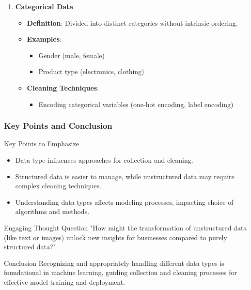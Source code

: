 \documentclass[aspectratio=169]{beamer}
\begin{document}
\begin{frame}[fragile]
\begin{enumerate}
        \item \textbf{Categorical Data}
            \begin{itemize}
                \item \textbf{Definition}: Divided into distinct categories without intrinsic ordering.
                \item \textbf{Examples}:
                    \begin{itemize}
                        \item Gender (male, female)
                        \item Product type (electronics, clothing)
                    \end{itemize}
                \item \textbf{Cleaning Techniques}:
                    \begin{itemize}
                        \item Encoding categorical variables (one-hot encoding, label encoding)
                    \end{itemize}
            \end{itemize}
    \end{enumerate}
\end{frame}

\begin{frame}[fragile]
    \frametitle{Key Points and Conclusion}
    \begin{block}{Key Points to Emphasize}
        \begin{itemize}
            \item Data type influences approaches for collection and cleaning.
            \item Structured data is easier to manage, while unstructured data may require complex cleaning techniques.
            \item Understanding data types affects modeling processes, impacting choice of algorithms and methods.
        \end{itemize}
    \end{block}

    \begin{block}{Engaging Thought Question}
        "How might the transformation of unstructured data (like text or images) unlock new insights for businesses compared to purely structured data?"
    \end{block}
    
    \begin{block}{Conclusion}
        Recognizing and appropriately handling different data types is foundational in machine learning, guiding collection and cleaning processes for effective model training and deployment.
    \end{block}
\end{frame}
\end{document}
